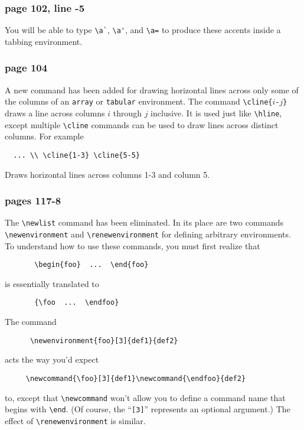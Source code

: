 \subsubsection*{page 102, line -5}
You will be able to type \hbox{\verb|\a`|}, \hbox{\verb|\a'|},
and \hbox{\verb|\a=|} to produce these accents inside a tabbing
environment.

\subsubsection*{page 104} 
A new command has been added for drawing horizontal lines across
only some of the columns of an {\tt array} or {\tt tabular}
environment.  The command \hbox{\verb"\cline{"{\tt $i$-$j$}\verb|}|}
draws a line across columns $i$ through $j$ inclusive.  It is used
just like \hbox{\verb"\hline"}, except multiple \hbox{\verb"\cline"}
commands can be used to draw lines across distinct columns.
For example
\begin{verbatim}
  ... \\ \cline{1-3} \cline{5-5}
\end{verbatim}
Draws horizontal lines across columns 1-3 and column 5.


\subsubsection* {pages 117-8}
The \hbox{\verb"\newlist"} command has been eliminated.  In its
place are two commands \hbox{\verb"\newenvironment"} and
\hbox{\verb"\renewenvironment"} for defining arbitrary environments.
To understand how to use these commands, you must first realize that
\begin{verbatim}
       \begin{foo}  ...  \end{foo}
\end{verbatim}
is essentially translated to
\begin{verbatim}
       {\foo  ...  \endfoo}
\end{verbatim}
The command
\begin{verbatim}
      \newenvironment{foo}[3]{def1}{def2}
\end{verbatim}
acts the way you'd expect
\begin{verbatim}
     \newcommand{\foo}[3]{def1}\newcommand{\endfoo}{def2}
\end{verbatim}
to, except that \hbox{\verb"\newcommand"} won't allow you to define a
command name that begins with \hbox{\verb"\end"}.  (Of course, the
``{\tt [3]}'' represents an optional argument.)  The effect of
\hbox{\verb"\renewenvironment"} is similar.

